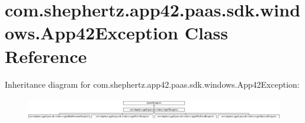 \hypertarget{classcom_1_1shephertz_1_1app42_1_1paas_1_1sdk_1_1windows_1_1_app42_exception}{\section{com.\+shephertz.\+app42.\+paas.\+sdk.\+windows.\+App42\+Exception Class Reference}
\label{classcom_1_1shephertz_1_1app42_1_1paas_1_1sdk_1_1windows_1_1_app42_exception}
}
Inheritance diagram for com.\+shephertz.\+app42.\+paas.\+sdk.\+windows.\+App42\+Exception\+:\begin{figure}[H]
\begin{center}
\leavevmode
\includegraphics[height=0.992908cm]{classcom_1_1shephertz_1_1app42_1_1paas_1_1sdk_1_1windows_1_1_app42_exception}
\end{center}
\end{figure}
